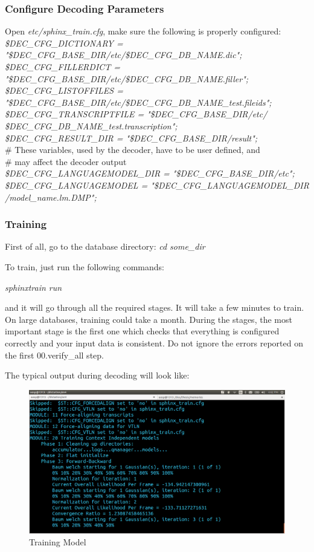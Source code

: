 \documentclass[12pt,a4paper,oneside]{memoir}
\begin{document}
\subsubsection{Configure Decoding Parameters}
Open \textit{etc/sphinx\_train.cfg}, make sure the following is properly configured:\\
\textit{
\$DEC\_CFG\_DICTIONARY     = "\$DEC\_CFG\_BASE\_DIR/etc/\$DEC\_CFG\_DB\_NAME.dic";
}\\
\textit{\$DEC\_CFG\_FILLERDICT     = "\$DEC\_CFG\_BASE\_DIR/etc/\$DEC\_CFG\_DB\_NAME.filler";}
\textit{\$DEC\_CFG\_LISTOFFILES    = "\$DEC\_CFG\_BASE\_DIR/etc/\${DEC\_CFG\_DB\_NAME}\_test.fileids";}
\textit{\$DEC\_CFG\_TRANSCRIPTFILE = "\$DEC\_CFG\_BASE\_DIR/etc/\\ \${DEC\_CFG\_DB\_NAME}\_test.transcription";}\\
\textit{\$DEC\_CFG\_RESULT\_DIR     = "\$DEC\_CFG\_BASE\_DIR/result";}\\
\# These variables, used by the decoder, have to be user defined, and\\
\# may affect the decoder output\\
\textit{\$DEC\_CFG\_LANGUAGEMODEL\_DIR = "\$DEC\_CFG\_BASE\_DIR/etc";}\\
\textit{\$DEC\_CFG\_LANGUAGEMODEL  = "\$DEC\_CFG\_LANGUAGEMODEL\_DIR\\/model\_name.lm.DMP";}

\subsubsection{Training}
 First of all, go to the database directory: 
\textit{cd some\_dir}

To train, just run the following commands: 

\textit{sphinxtrain run}

and it will go through all the required stages. It will take a few minutes to train. On large databases, training could take a month.
During the stages, the most important stage is the first one which checks that everything is configured correctly and your input data is consistent. Do not ignore the errors reported on the first 00.verify\_all step.

 The typical output during decoding will look like: 

\begin{figure}[h]
    \centering
    \includegraphics[scale=0.3]{Screenshot3}
    \caption{Training Model}
\end{figure}
\end{document}
